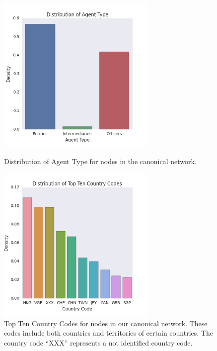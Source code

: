 \documentclass[11pt]{article}
\begin{document}
\begin{figure}[H]
\centering
\begin{minipage}{.5\textwidth}
  \centering
  \includegraphics[width=3in]{figures/figure3.png}
  \caption{Distribution of Agent Type for nodes in the canonical network.}
  \label{fig3}
\end{minipage}%
\begin{minipage}{.5\textwidth}
  \centering
  \includegraphics[width=3in]{figures/figure4.png}
  \caption{Top Ten Country Codes for nodes in our canonical network.
            These codes include both countries and territories of certain
            countries. The country code ``XXX'' represents a not identified
            country code.}
  \label{fig4}
\end{minipage}
\end{figure}
\end{document}
